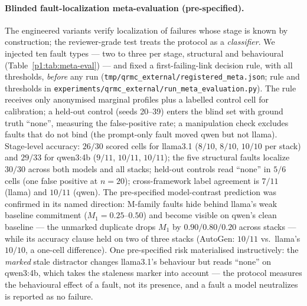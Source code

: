 \documentclass{article}
\begin{document}
\paragraph{Blinded fault-localization meta-evaluation (pre-specified).}
The engineered variants verify localization of failures whose stage
is known by construction; the reviewer-grade test treats the protocol
as a \emph{classifier}. We injected ten fault types --- two to three
per stage, structural and behavioural (Table~\ref{p1:tab:meta-eval}) ---
and fixed a first-failing-link decision rule, with all thresholds,
\emph{before} any run (\texttt{tmp/qrmc\_external/registered\_meta.json};
rule and thresholds in
\texttt{experiments/qrmc\_external/run\_meta\_evaluation.py}). The
rule receives only anonymised marginal profiles plus a labelled
control cell for calibration; a held-out control (seeds 20--39)
enters the blind set with ground truth ``none'', measuring the
false-positive rate; a manipulation check excludes faults that do not
bind (the prompt-only fault moved qwen but not llama). Stage-level
accuracy: $26/30$ scored cells for llama3.1 ($8/10$, $8/10$, $10/10$
per stack) and $29/33$ for qwen3:4b ($9/11$, $10/11$, $10/11$); the
five structural faults localize $30/30$ across both models and all
stacks; held-out controls read ``none'' in $5/6$ cells (one false
positive at $n{=}20$); cross-framework label agreement is $7/11$
(llama) and $10/11$ (qwen). The pre-specified model-contrast prediction
was confirmed in its named direction: M-family faults hide behind
llama's weak baseline commitment ($M_1{=}0.25$--$0.50$) and become
visible on qwen's clean baseline --- the unmarked duplicate drops
$M_1$ by $0.90/0.80/0.20$ across stacks --- while its accuracy clause
held on two of three stacks (AutoGen: $10/11$ vs.\ llama's $10/10$,
a one-cell difference). One pre-specified risk materialised
instructively: the \emph{marked} stale distractor changes llama3.1's behaviour but
reads ``none'' on qwen3:4b, which takes the staleness marker into
account --- the protocol measures the behavioural effect of a fault,
not its presence, and a fault a model neutralizes is reported as no
failure.
\end{document}
